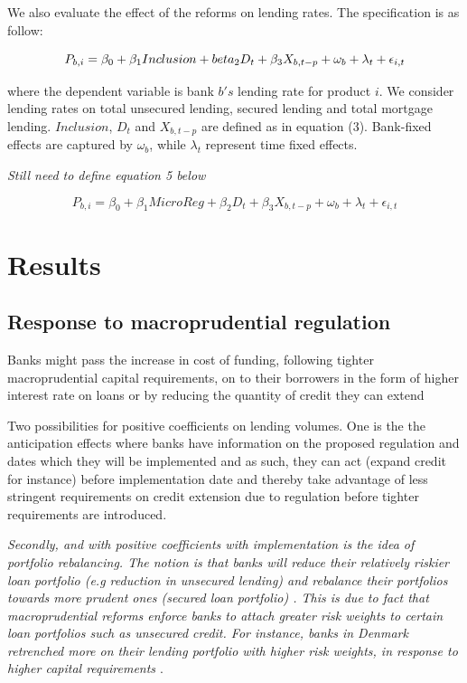 \documentclass[
  letterpaper,
  DIV=11,
  numbers=noendperiod]{scrartcl}
\begin{document}
We also evaluate the effect of the reforms on lending rates. The
specification is as follow:

\begin{equation}
    P_{b,i}= \beta_{0}+\beta_{1}Inclusion+ \\beta_{2}D_{t}+\beta_{3}X_{b,t-p}+ \omega_{b}+ \lambda_{t}+\epsilon_{i,t}
\end{equation}

where the dependent variable is bank \(b's\) lending rate for product
\(i\). We consider lending rates on total unsecured lending, secured
lending and total mortgage lending. \(Inclusion\), \(D_{t}\) and
\(X_{b,t-p}\) are defined as in equation (3). Bank-fixed effects are
captured by \(\omega_{b}\), while \(\lambda_{t}\) represent time fixed
effects.

\textit{Still need to define equation 5 below}

\begin{equation}
    P_{b,i}= \beta_{0}+\beta_{1}MicroReg+ \beta_{2}D_{t}+\beta_{3}X_{b,t-p}+ \omega_{b}+ \lambda_{t}+\epsilon_{i,t}
\end{equation}

\hypertarget{results}{%
\section{Results}\label{results}}

\hypertarget{response-to-macroprudential-regulation}{%
\subsection{Response to macroprudential
regulation}\label{response-to-macroprudential-regulation}}

Banks might pass the increase in cost of funding, following tighter
macroprudential capital requirements, on to their borrowers in the form
of higher interest rate on loans or by reducing the quantity of credit
they can extend \citep{noss2016estimating}

Two possibilities for positive coefficients on lending volumes. One is
the the anticipation effects where banks have information on the
proposed regulation and dates which they will be implemented and as
such, they can act (expand credit for instance) before implementation
date and thereby take advantage of less stringent requirements on credit
extension due to regulation before tighter requirements are introduced.

\textit{Secondly, and with positive coefficients with implementation is the idea of portfolio rebalancing. The notion is that banks will reduce their relatively riskier loan portfolio (e.g reduction in unsecured lending) and rebalance their portfolios towards more prudent ones (secured loan portfolio) \citep{deli2017real}. This is due to fact that macroprudential reforms enforce banks to attach greater risk weights to certain loan portfolios such as unsecured credit. For instance, banks in Denmark retrenched more on their lending portfolio with higher risk weights, in response to higher capital requirements \citep{imbierowicz2018time}}.
\end{document}
